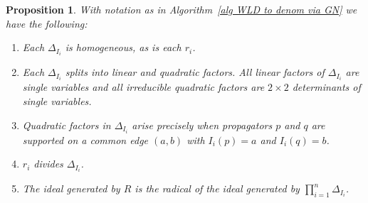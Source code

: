 \documentclass[11pt]{article}
\newtheorem{prop}[thm]{Proposition}
\theoremstyle{remark}
\theoremstyle{definition}
\begin{document}
\begin{prop}\label{prop alg gives rad}
  With notation as in Algorithm~\ref{alg WLD to denom via GN} we have the following:
  \begin{enumerate}
    \item Each $\Delta_{I_i}$ is homogeneous, as is each $r_i$.
    \item Each $\Delta_{I_i}$ splits into linear and quadratic factors.  All linear factors of  $\Delta_{I_i}$ are single variables and all irreducible quadratic factors are $2\times 2$ determinants of single variables.
    \item Quadratic factors in $\Delta_{I_i}$ arise precisely when propagators $p$ and $q$ are supported on a common edge $(a,b)$ with $I_i(p)=a$ and $I_i(q)=b$.
    \item $r_i$ divides $\Delta_{I_i}$.
    \item The ideal generated by $R$ is the radical of the ideal generated by $\prod_{i=1}^{n}\Delta_{I_i}$.
  \end{enumerate}
\end{prop}
\end{document}
